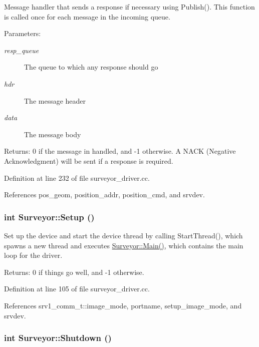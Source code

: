 Message handler that sends a response if necessary using Publish(). This function is called once for each message in the incoming queue. 

\begin{Desc}
\item[Parameters:]
\begin{description}
\item[{\em resp\_\-queue}]The queue to which any response should go \item[{\em hdr}]The message header \item[{\em data}]The message body \end{description}
\end{Desc}
\begin{Desc}
\item[Returns:]0 if the message in handled, and -1 otherwise. A NACK (Negative Acknowledgment) will be sent if a response is required. \end{Desc}


Definition at line 232 of file surveyor\_\-driver.cc.

References pos\_\-geom, position\_\-addr, position\_\-cmd, and srvdev.\hypertarget{classSurveyor_c127d6028c08790fe79902b1b8359468}{
\subsubsection[{Setup}]{\setlength{\rightskip}{0pt plus 5cm}int Surveyor::Setup ()}}
\label{classSurveyor_c127d6028c08790fe79902b1b8359468}


Set up the device and start the device thread by calling StartThread(), which spawns a new thread and executes \hyperlink{classSurveyor_e6ae9ea8d60a2038b6dacdab7ccee458}{Surveyor::Main()}, which contains the main loop for the driver. 

\begin{Desc}
\item[Returns:]0 if things go well, and -1 otherwise. \end{Desc}


Definition at line 105 of file surveyor\_\-driver.cc.

References srv1\_\-comm\_\-t::image\_\-mode, portname, setup\_\-image\_\-mode, and srvdev.\hypertarget{classSurveyor_cfe0180d05f0a34474a75cdfd87b1a81}{
\subsubsection[{Shutdown}]{\setlength{\rightskip}{0pt plus 5cm}int Surveyor::Shutdown ()}}
\label{classSurveyor_cfe0180d05f0a34474a75cdfd87b1a81}



